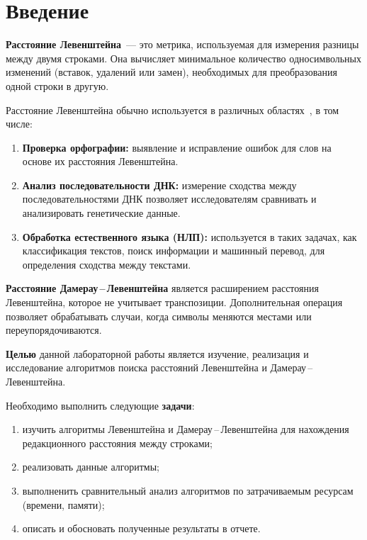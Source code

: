 \chapter*{Введение}

\textbf{Расстояние Левенштейна}~--- это метрика, используемая для измерения разницы между двумя строками. Она вычисляет минимальное количество односимвольных изменений (вставок, удалений или замен), необходимых для преобразования одной строки в другую.

Расстояние Левенштейна обычно используется в различных областях~\cite{analysis-lev-damlev}, в том числе:
\begin{enumerate}
    \item \textbf{Проверка орфографии:} выявление и исправление ошибок для слов на основе их расстояния Левенштейна.
    \item \textbf{Анализ последовательности ДНК:} измерение сходства между последовательностями ДНК позволяет исследователям сравнивать и анализировать генетические данные.
    \item \textbf{Обработка естественного языка (НЛП):} используется в таких задачах, как классификация текстов, поиск информации и машинный перевод, для определения сходства между текстами.
\end{enumerate}

\textbf{Расстояние Дамерау\,--\,Левенштейна} является расширением расстояния Левенштейна, которое не учитывает транспозиции. Дополнительная операция позволяет обрабатывать случаи, когда символы меняются местами или переупорядочиваются.

\textbf{Целью} данной лабораторной работы является изучение, реализация и исследование алгоритмов поиска расстояний Левенштейна и Дамерау\,--\,Левенштейна.

Необходимо выполнить следующие \textbf{задачи}:
\begin{enumerate}[label={\arabic*)}]
    \item изучить алгоритмы Левенштейна и Дамерау\,--\,Левенштейна для нахождения редакционного расстояния между строками;
    \item реализовать данные алгоритмы;
    \item выполненить сравнительный анализ алгоритмов по затрачиваемым ресурсам (времени, памяти);
    \item описать и обосновать полученные результаты в отчете.
\end{enumerate}